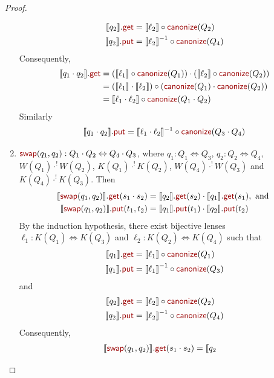 \documentclass[acmsmall,review,anonymous]{acmart}
\newcommand{\kw}[1]{\textcolor{dkred}{\ensuremath{\mathsf{#1}}}}
\newcommand{\canonize}{\ensuremath{\kw{canonize}}}
\newcommand{\get}{\ensuremath{\kw{get}}}
\newcommand{\lput}{\ensuremath{\kw{put}}}
\newcommand{\swap}{\ensuremath{\kw{swap}}}
\begin{document}
\begin{proof}
\begin{enumerate}
\begin{align*}
\llbracket q_2 \rrbracket.\get &= \llbracket \ell_2 \rrbracket \circ
\canonize(Q_2)\\
\llbracket q_2 \rrbracket.\lput &= {\llbracket \ell_2 \rrbracket}^{-1} \circ
\canonize(Q_4)
\end{align*}
Consequently,
\begin{align*}
\llbracket q_1 \cdot q_2 \rrbracket.\get &= (\llbracket \ell_1 \rrbracket \circ
\canonize(Q_1)) \cdot  (\llbracket \ell_2 \rrbracket \circ
\canonize(Q_2))\\
&= (\llbracket \ell_1 \rrbracket \cdot \llbracket \ell_2
\rrbracket) \circ (\canonize(Q_1) \cdot \canonize(Q_2))\\
&= \llbracket \ell_1 \cdot  \ell_2 \rrbracket \circ \canonize(Q_1 \cdot Q_2)
\end{align*}
Similarly
$$
\llbracket q_1 \cdot q_2\rrbracket.\lput = \llbracket \ell_1 \cdot  \ell_2
\rrbracket^{-1} \circ \canonize(Q_3 \cdot Q_4) $$
\item
$\swap(q_1,q_2): Q_1 \cdot Q_2 \Leftrightarrow Q_4 \cdot Q_3$, where $q_1 : Q_1
\Leftrightarrow Q_3 $,  $q_2 : Q_2 \Leftrightarrow Q_4$, $W(Q_1)
\cdot^! W(Q_2)$, $K(Q_1) \cdot^! K(Q_2)$, $W(Q_4) \cdot^! W(Q_3)$ and $
K(Q_4) \cdot^! K(Q_3)$. Then
\begin{align*}
\llbracket \swap(q_1, q_2) \rrbracket.\get(s_1 \cdot s_2) &= \llbracket q_2
\rrbracket.\get(s_2) \cdot \llbracket q_1 \rrbracket.\get(s_1), \text{ and }\\
\llbracket \swap(q_1, q_2) \rrbracket.\lput(t_1, t_2) &= \llbracket q_1
\rrbracket.\lput(t_1) \cdot \llbracket q_2 \rrbracket.\lput(t_2)
\end{align*}
By the induction hypothesis, there exist bijective lenses $\ell_1 : K(Q_1)
\Leftrightarrow K(Q_3)$ and $\ell_2 : K(Q_2) \Leftrightarrow K(Q_4)$ such that
\begin{align*}
\llbracket q_1 \rrbracket.\get &= \llbracket \ell_1 \rrbracket \circ
\canonize(Q_1)\\
\llbracket q_1 \rrbracket.\lput &= {\llbracket \ell_1 \rrbracket}^{-1} \circ
\canonize(Q_3)
\end{align*}
and
\begin{align*}
\llbracket q_2 \rrbracket.\get &= \llbracket \ell_2 \rrbracket \circ
\canonize(Q_2)\\
\llbracket q_2 \rrbracket.\lput &= {\llbracket \ell_2 \rrbracket}^{-1} \circ
\canonize(Q_4)
\end{align*}
Consequently,
\begin{align*}
\llbracket \swap(q_1, q_2) \rrbracket.\get(s_1 \cdot s_2) &= \llbracket q_2

\end{align*}
\end{enumerate}
\end{proof}
\end{document}
